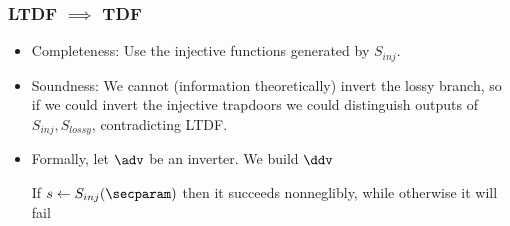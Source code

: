 \documentclass{beamer}
\begin{document}
\begin{frame}
    \frametitle{LTDF $\implies$ TDF}
    \begin{itemize}
        \item Completeness: Use the injective functions generated by $S_{inj}$.
        \item Soundness: We cannot (information theoretically) invert the lossy branch,
              so if we could invert the injective trapdoors we could distinguish outputs
              of $S_{inj}, S_{lossy}$, contradicting LTDF.
        \item Formally, let $\adv$ be an inverter. We build $\ddv$
              \begin{pchstack}[center]
              \end{pchstack}
              If $s \leftarrow S_{inj}(\secparam)$ then it succeeds nonneglibly, while otherwise it will fail
    \end{itemize}
\end{frame}
\end{document}
